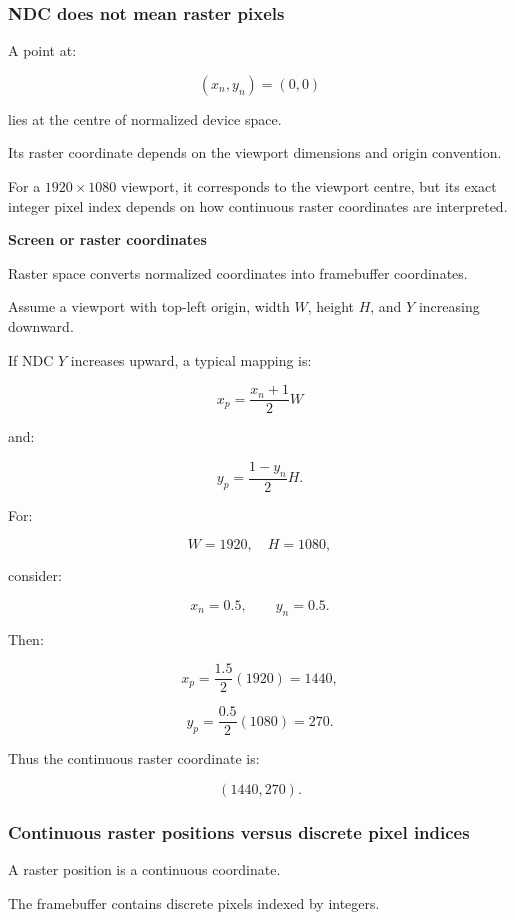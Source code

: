 \subsubsection{NDC does not mean raster pixels}\label{02-foundations-ii-ch032-ndc-does-not-mean-raster-pixels}

A point at:

\[
 (x_n,y_n)=(0,0)
\]

lies at the centre of normalized device space.

Its raster coordinate depends on the viewport dimensions and origin convention.

For a \(1920\times1080\) viewport, it corresponds to the viewport centre, but its exact integer pixel index depends on how continuous raster coordinates are interpreted.

\textbf{Screen or raster coordinates}

Raster space converts normalized coordinates into framebuffer coordinates.

Assume a viewport with top-left origin, width \(W\), height \(H\), and \(Y\) increasing downward.

If NDC \(Y\) increases upward, a typical mapping is:

\[
 \boxed{ x_p=\frac{x_n+1}{2}W }
\]

and:

\[
 \boxed{ y_p=\frac{1-y_n}{2}H }.
\]

For:

\[
 W=1920,\quad H=1080,
\]

consider:

\[
 x_n=0.5,\qquad y_n=0.5.
\]

Then:

\[
 x_p=\frac{1.5}{2}(1920)=1440,
\]

\[
 y_p=\frac{0.5}{2}(1080)=270.
\]

Thus the continuous raster coordinate is:

\[
 \boxed{(1440,270)}.
\]

\subsubsection{Continuous raster positions versus discrete pixel indices}\label{02-foundations-ii-ch032-continuous-raster-positions-versus-discrete-pixel-indices}

A raster position is a continuous coordinate.

The framebuffer contains discrete pixels indexed by integers.

